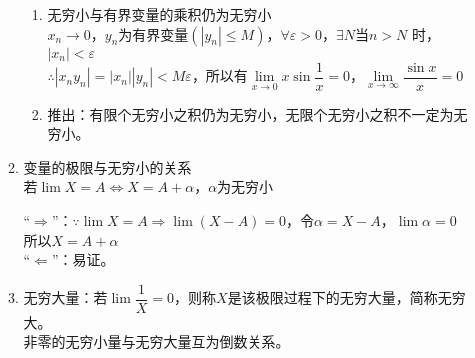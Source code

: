 \documentclass[11pt,fleqn]{book} %
\begin{document}
\begin{enumerate}
\begin{enumerate}[label=(\arabic*)]
\begin{enumerate}[label=(\roman*)]
  \item 无穷小与有界变量的乘积仍为无穷小\\
  $x_n \rightarrow 0$，$y_n$为有界变量$(|y_n|\leqslant M)$，$\forall \varepsilon>0$，$\exists N$当$n>N$ 时，$|x_n|<\varepsilon$\\
  $\therefore |x_ny_n|=|x_n||y_n|<M\varepsilon$，所以有$\lim\limits_{x\rightarrow 0}x\sin\dfrac{1}{x}=0$，$\lim\limits_{x\rightarrow \infty}\dfrac{\sin x}{x} = 0$
  \item 推出：有限个无穷小之积仍为无穷小，无限个无穷小之积不一定为无穷小。
\end{enumerate}
\item 变量的极限与无穷小的关系\\
若$\lim X = A \Leftrightarrow X = A+\alpha$，$\alpha$为无穷小
\begin{prove}
“$\Rightarrow$”：$\because \lim X = A \Rightarrow \lim(X-A) = 0$，令$\alpha = X - A$，$\lim \alpha = 0$\\
所以$X = A+\alpha$\\
“$\Leftarrow$”：易证。
\end{prove}
\item 无穷大量：若$\lim \dfrac{1}{X}=0$，则称$X$是该极限过程下的无穷大量，简称无穷大。\\
非零的无穷小量与无穷大量互为倒数关系。
\end{enumerate}
\end{enumerate}
\end{document}
